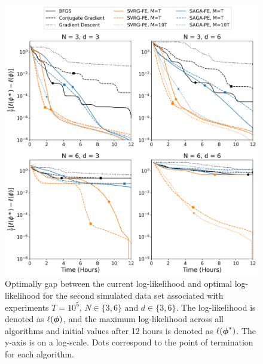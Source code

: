 \documentclass[12pt]{article}
\begin{document}
\begin{figure}[H]
    \centering
    \includegraphics[width=6.5in]{../plt/log-like_v_time_T-100000-001.png}
    \caption{Optimally gap between the current log-likelihood and optimal log-likelihood for the second simulated data set associated with experiments $T=10^{5}$, $N \in \{3,6\}$ and $d \in \{3,6\}$. The log-likelihood is denoted as $\ell(\boldsymbol{\phi})$, and the maximum log-likelihood across all algorithms and initial values after 12 hours is denoted as $\ell(\boldsymbol{\phi}^*)$. The y-axis is on a log-scale. Dots correspond to the point of termination for each algorithm.}
\end{figure}
%
\end{document}
